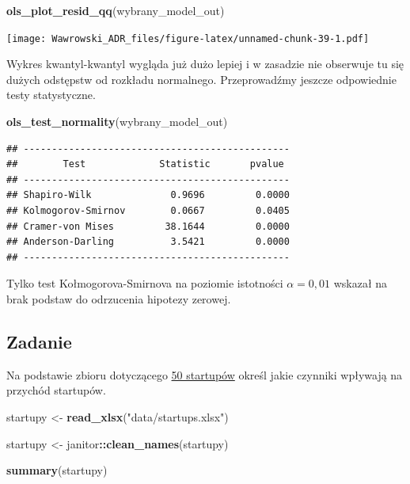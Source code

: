 \documentclass[
]{book}
\newenvironment{Shaded}{\begin{snugshade}}{\end{snugshade}}
\newcommand{\KeywordTok}[1]{\textcolor[rgb]{0.13,0.29,0.53}{\textbf{#1}}}
\newcommand{\NormalTok}[1]{#1}
\newcommand{\OperatorTok}[1]{\textcolor[rgb]{0.81,0.36,0.00}{\textbf{#1}}}
\newcommand{\StringTok}[1]{\textcolor[rgb]{0.31,0.60,0.02}{#1}}
\begin{document}
\begin{Shaded}
\begin{Highlighting}[]
\KeywordTok{ols_plot_resid_qq}\NormalTok{(wybrany_model_out)}
\end{Highlighting}
\end{Shaded}

\texttt{[image: Wawrowski\_ADR\_files/figure-latex/unnamed-chunk-39-1.pdf]}

Wykres kwantyl-kwantyl wygląda już dużo lepiej i w zasadzie nie obserwuje tu się dużych odstępstw od rozkładu normalnego. Przeprowadźmy jeszcze odpowiednie testy statystyczne.

\begin{Shaded}
\begin{Highlighting}[]
\KeywordTok{ols_test_normality}\NormalTok{(wybrany_model_out)}
\end{Highlighting}
\end{Shaded}

\begin{verbatim}
## -----------------------------------------------
##        Test             Statistic       pvalue  
## -----------------------------------------------
## Shapiro-Wilk              0.9696         0.0000 
## Kolmogorov-Smirnov        0.0667         0.0405 
## Cramer-von Mises         38.1644         0.0000 
## Anderson-Darling          3.5421         0.0000 
## -----------------------------------------------
\end{verbatim}

Tylko test Kołmogorova-Smirnova na poziomie istotności \(\alpha=0,01\) wskazał na brak podstaw do odrzucenia hipotezy zerowej.

\hypertarget{zadanie-1}{%
\subsection{Zadanie}\label{zadanie-1}}

Na podstawie zbioru dotyczącego \href{data/startups.xlsx}{50 startupów} określ jakie czynniki wpływają na przychód startupów.

\begin{Shaded}
\begin{Highlighting}[]
\NormalTok{startupy <-}\StringTok{ }\KeywordTok{read_xlsx}\NormalTok{(}\StringTok{"data/startups.xlsx"}\NormalTok{)}

\NormalTok{startupy <-}\StringTok{ }\NormalTok{janitor}\OperatorTok{::}\KeywordTok{clean_names}\NormalTok{(startupy)}

\KeywordTok{summary}\NormalTok{(startupy)}
\end{Highlighting}
\end{Shaded}
\end{document}
